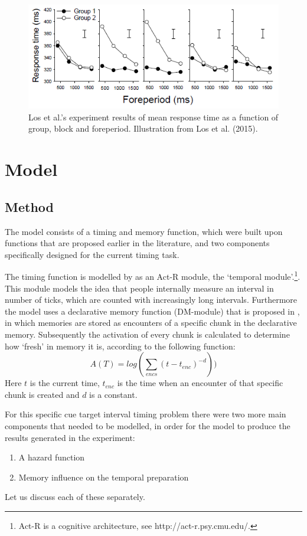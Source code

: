\documentclass[10pt,letterpaper]{article}
\begin{document}
\begin{figure}
	\centering
	\includegraphics[width=\columnwidth]{Los1.png}
	\caption{Los et al.'s experiment results of mean response time as a function of group, block and foreperiod. Illustration from Los et al. (2015).}
	\label{LosFigure}
\end{figure}

\section{Model}
\subsection{Method}
The model consists of a timing and memory function, which were built upon functions that are proposed earlier in the literature, and two components specifically designed for the current timing task. 

The timing function is modelled by \citet{Taatgen1} as an Act-R module, the `temporal module'.\footnote{Act-R is a cognitive architecture, see http://act-r.psy.cmu.edu/.}. This module models the idea that people internally measure an interval in number of ticks, which are counted with increasingly long intervals. Furthermore the model uses a declarative memory function (DM-module) that is proposed in \citet{Taatgen}, in which memories are stored as encounters of a specific chunk in the declarative memory. Subsequently the activation of every chunk is calculated to determine how `fresh' in memory it is, according to the following function:
\begin{equation}
	A(T) = log(\sum_{encs}(t - t_{enc})^{-d}))
\end{equation}
Here $t$ is the current time, $t_{enc}$ is the time when an encounter of that specific chunk is created and $d$ is a constant.

For this specific cue target interval timing problem there were two more main components that needed to be modelled, in order for the model to produce the results generated in the experiment:
\begin{enumerate}
	\item A hazard function
	\item Memory influence on the temporal preparation
\end{enumerate}
Let us discuss each of these separately.
\end{document}
